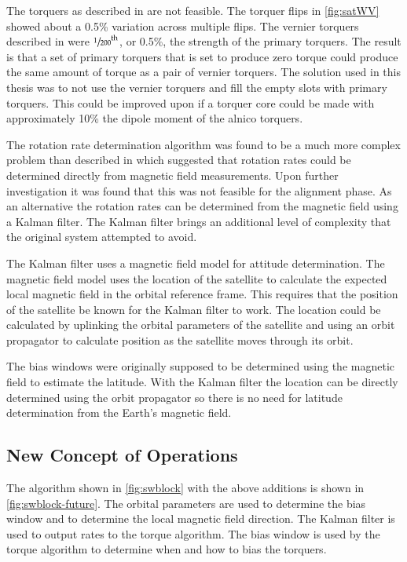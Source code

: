 The torquers as described in \cite{Mentch11} are not feasible. The torquer flips in \cref{fig:satWV} showed about a \textpm{}0.5\% variation across multiple flips. The vernier torquers described in \cite{Mentch11} were $\sfrac{1}{200}^{\mathrm{th}}$, or 0.5\%, the strength of the primary torquers. The result is that a set of primary torquers that is set to produce zero torque could produce the same amount of torque as a pair of vernier torquers. The solution used in this thesis was to not use the vernier torquers and fill the empty slots with primary torquers. This could be improved upon if a torquer core could be made with approximately 10\% the dipole moment of the alnico torquers. 

The rotation rate determination algorithm was found to be a much more complex problem than described in \cite{Mentch11} which suggested that rotation rates could be determined directly from magnetic field measurements. Upon further investigation it was found that this was not feasible for the alignment phase. As an alternative the rotation rates can be determined from the magnetic field using a Kalman filter. The Kalman filter brings an additional level of complexity that the original system attempted to avoid. 

The Kalman filter uses a magnetic field model for attitude determination. The magnetic field model uses the location of the satellite to calculate the expected local magnetic field in the orbital reference frame. This requires that the position of the satellite be known for the Kalman filter to work. The location could be calculated by uplinking the orbital parameters of the satellite and using an orbit propagator to calculate position as the satellite moves through its orbit.

The bias windows were originally supposed to be determined using the magnetic field to estimate the latitude. With the Kalman filter the location can be directly determined using the orbit propagator so there is no need for latitude determination from the Earth's magnetic field.

\subsection{New Concept of Operations}

The algorithm shown in \cref{fig:swblock} with the above additions is shown in \cref{fig:swblock-future}. The orbital parameters are used to determine the bias window and to determine the local magnetic field direction. The Kalman filter is used to output rates to the torque algorithm. The bias window is used by the torque algorithm to determine when and how to bias the torquers.

